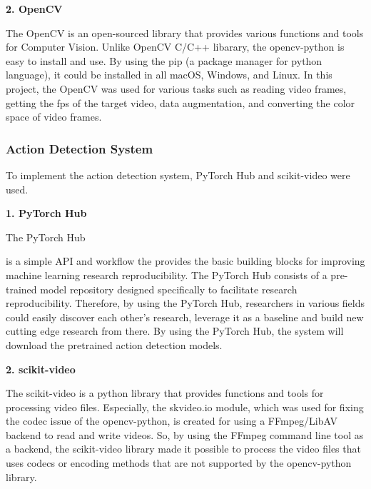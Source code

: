 \documentclass{article}
\begin{document}
\textbf{2. OpenCV}

The OpenCV is an open-sourced library that provides various functions and tools for Computer Vision. Unlike OpenCV C/C++ libarary, the opencv-python is easy to install and use. By using the pip (a package manager for python language), it could be installed in all macOS, Windows, and Linux. In this project, the OpenCV was used for various tasks such as reading video frames, getting the fps of the target video, data augmentation, and converting the color space of video frames.

\subsubsection{Action Detection System}

To implement the action detection system, PyTorch Hub and scikit-video were used.

\textbf{1. PyTorch Hub}

\hypertarget{actionDetection_used}{The PyTorch Hub} is a simple API and workflow the provides the basic building blocks for improving machine learning research reproducibility. The PyTorch Hub consists of a pre-trained model repository designed specifically to facilitate research reproducibility.  Therefore, by using the PyTorch Hub, researchers in various fields could easily discover each other’s research, leverage it as a baseline and build new cutting edge research from there. By using the PyTorch Hub, the system will download the pretrained action detection models.

\textbf{2. scikit-video}

The scikit-video is a python library that provides functions and tools for processing video files. Especially, the skvideo.io module, which was used for fixing the codec issue of the opencv-python, is created for using a FFmpeg/LibAV backend to read and write videos. So, by using the FFmpeg command line tool as a backend, the scikit-video library made it possible to process the video files that uses codecs or encoding methods that are not supported by the opencv-python library.
\end{document}

